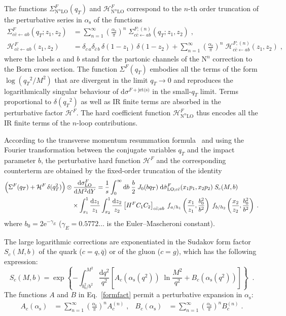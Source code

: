 \documentclass[12pt]{article}
\DeclareRobustCommand{\nn}{\nonumber}
\DeclareRobustCommand{\alphas}{\ensuremath{\alpha_{\mathrm{s}}}\xspace}
\DeclareRobustCommand{\as}{\alphas}
\DeclareRobustCommand{\asOpi}{\ensuremath{\left(\frac{\as}{\pi}\right)}} %
\DeclareRobustCommand{\mur}{\ensuremath{\mu_{\mathrm{R}}}\xspace}
\DeclareRobustCommand{\muf}{\ensuremath{\mu_{\mathrm{F}}}\xspace}
\DeclareRobustCommand{\qt}{\ensuremath{q_T}\xspace}
\DeclareRobustCommand{\rd}{\ensuremath{\mathrm{d}}}
\DeclareRobustCommand{\cH}{\ensuremath{\mathcal{H}}}
\DeclareRobustCommand{\jets}{\text{jet(s)}\xspace}
\DeclareRobustCommand{\LO}{\text{LO}\xspace}
\DeclareRobustCommand{\N}[1]{\ensuremath{\text{N}^{#1}}} %
\begin{document}
The functions $\Sigma^{F}_{\N{n}\LO}(\qt)$ and $\cH^{F}_{\N{n}\LO}$ correspond to the $n$-th order truncation of the perturbative series in $\as$ of the functions
\begin{align}
  \Sigma^F_{c\bar{c} \gets ab}(\qt; z_1,z_2) %
  &=
  \sum_{n=1}^\infty \asOpi^n \; 
  \Sigma^{F;(n)}_{c\bar{c} \gets ab}(\qt; z_1,z_2) %
  \;,
  \label{eq:sigexpansion}
  \\
  \cH^F_{c\bar{c} \gets ab}(z_1,z_2) %
  &=
  \delta_{c\,a}\delta_{\bar{c}\,b} \, \delta(1-z_1) \, \delta(1-z_2) +
  \sum_{n=1}^\infty \asOpi^n \; 
  \cH^{F;(n)}_{c\bar{c} \gets ab}(z_1,z_2) %
  \;,
  \label{Hstexpand}
\end{align}
where the labels $a$ and $b$ stand for the partonic channels of the \N{n}\LO correction to the Born cross section. 
The function $ \Sigma^{F}(\qt)$ embodies all the terms of the form $\log(\qt^2/M^2)$ that are divergent in the limit $\qt \rightarrow 0$ and reproduces the logarithmically singular behaviour of  $\rd\sigma^{F+\jets}$ in the small-$\qt$ limit. 
Terms proportional to $\delta(\qt^{2})$ as well as IR finite terms are absorbed in the perturbative factor $\mathcal{H}^{F}$. The hard coefficient function $\mathcal{H}^{F}_{\N{n}\LO}$ thus encodes all the IR finite terms of the $n$-loop contributions.


According to the transverse momentum resummation formula~\cite{Bozzi:2005wk} and using the Fourier transformation between the conjugate variables $\qt$ and the impact parameter $b$, the perturbative hard function $\cH^{F}$ and the corresponding counterterm are obtained by the fixed-order truncation of the identity 
\begin{align}
  \Bigl( \Sigma^F(\qt)  + \cH^F\,\delta(\qt^2) \Bigr) &\otimes 
  \frac{\rd\sigma^{F}_{\LO}}{\rd M^2\rd Y} 
  =
  \frac{1}{s}\int_0^\infty\rd b\;\frac{b}{2}\;J_0(b\qt)\;
  \rd\hat{\sigma}^{F}_{\LO;c\bar{c}}(x_1 p_1, x_2 p_2) \; 
  S_c(M,b) \; 
  \nn\\&\quad\times
\int_{x_{1}}^1 \frac{\rd z_1}{z_{1}} \int_{x_{2}}^1  \frac{\rd z_2}{z_{2}} 
  \left[ H^{F} C_1 C_2 \right]_{c\bar{c};ab} \;
  f_{a/h_1}\left(\frac{x_1}{z_1},\frac{b_0^2}{b^2}\right) \; f_{b/h_2}\left(\frac{x_2}{z_2},\frac{b_0^2}{b^2}\right) \;.
  \label{reslean}
\end{align}
where  $b_0=2 \mathrm{e}^{-\gamma_E}$ ($\gamma_E=0.5772\ldots$  is the Euler--Mascheroni constant).

The large logarithmic corrections are exponentiated in the Sudakov form factor $S_c(M,b)$ of the quark  ($c=q, {\bar q}$) or of the gluon ($c=g$), which has the following  expression:
\begin{equation}
\label{formfact}
S_c(M,b) = \exp \left\{ - \int_{b_0^2/b^2}^{M^2} \frac{\rd q^2}{q^2} 
\left[ A_c(\as(q^2)) \;\ln \frac{M^2}{q^2} + B_c(\as(q^2)) \right] \right\} 
\;\;. 
\end{equation}
The functions $A$ and $B$  in Eq.~\eqref{formfact} permit a perturbative expansion in $\as$:
\begin{align}
  A_c(\as) &= 
  \sum_{n=1}^\infty \asOpi^n A_c^{(n)} \;,
  &
  B_c(\as) &= 
  \sum_{n=1}^\infty \asOpi^n B_c^{(n)} \;.
  \label{eq:abexp}
\end{align}
\end{document}
